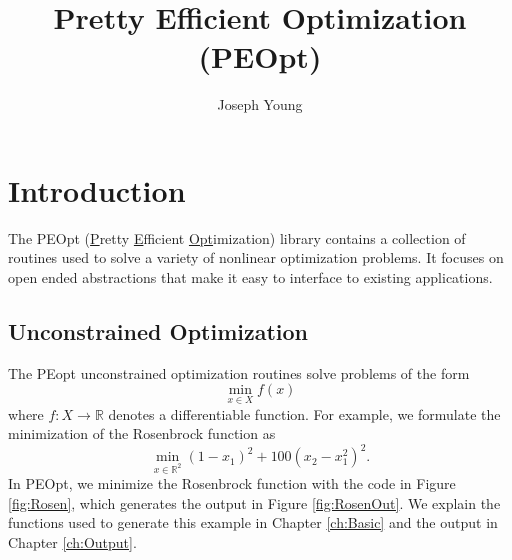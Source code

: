 \documentclass{report}
\title{Pretty Efficient Optimization (PEOpt)}
\author{Joseph Young}
\newcommand{\re}{\mathbb{R}}
\begin{document}
\maketitle
\tableofcontents

\chapter{Introduction}

        The PEOpt (\underline{P}retty \underline{E}fficient \underline{Opt}imization) library contains a collection of routines used to solve a variety of nonlinear optimization problems.  It focuses on open ended abstractions that make it easy to interface to existing applications.

\section{Unconstrained Optimization}

        The PEopt unconstrained optimization routines solve problems of the form
$$
        \min_{x\in X} f(x)
$$
where $f:X\rightarrow \re$ denotes a differentiable function.  For example, we formulate the minimization of the Rosenbrock function as
$$
        \min_{x\in\re^2} (1-x_1)^2+100(x_2-x_1^2)^2.
$$
In PEOpt, we minimize the Rosenbrock function with the code in Figure \ref{fig:Rosen}, which generates the output in Figure \ref{fig:RosenOut}.  We explain the functions used to generate this example in Chapter \ref{ch:Basic} and the output in Chapter \ref{ch:Output}.
\end{document}
